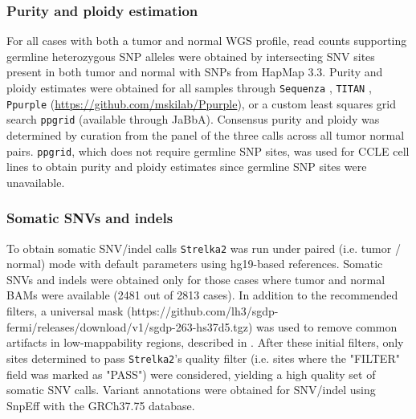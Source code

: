 \documentclass[phd,tocprelim]{cornell}
\begin{document}
\subsubsection*{Purity and ploidy estimation}

For all cases with both a tumor and normal WGS profile, read counts supporting germline heterozygous SNP alleles were obtained by intersecting SNV sites present in both tumor and normal with SNPs from HapMap 3.3. Purity and ploidy estimates were obtained for all samples through \texttt{Sequenza} \cite{Favero2015-zd}, \texttt{TITAN} \cite{ha2014}, \texttt{Ppurple}  (\url{https://github.com/mskilab/Ppurple}), or a custom least squares grid search \texttt{ppgrid} (available through JaBbA). Consensus purity and ploidy was determined by curation from the panel of the three calls across all tumor normal pairs. \texttt{ppgrid}, which does not require germline SNP sites, was used for CCLE cell lines to obtain purity and ploidy estimates since germline SNP sites were unavailable.


\subsubsection*{Somatic SNVs and indels}

To obtain somatic SNV/indel calls \texttt{Strelka2} \cite{kim2018} was run under paired (i.e. tumor / normal) mode with default parameters using hg19-based references. Somatic SNVs and indels were obtained only for those cases where tumor and normal BAMs were available (2481 out of 2813 cases). In addition to the recommended filters, a universal mask (https://github.com/lh3/sgdp-fermi/releases/download/v1/sgdp-263-hs37d5.tgz) was used to remove common artifacts in low-mappability regions, described in \cite{mallick2016}.  After these initial filters, only sites determined to pass \texttt{Strelka2}'s quality filter (i.e. sites where the "FILTER" field was marked as "PASS") were considered, yielding a high quality set of somatic SNV calls. Variant annotations were obtained for SNV/indel using SnpEff with the GRCh37.75 database.
\end{document}
